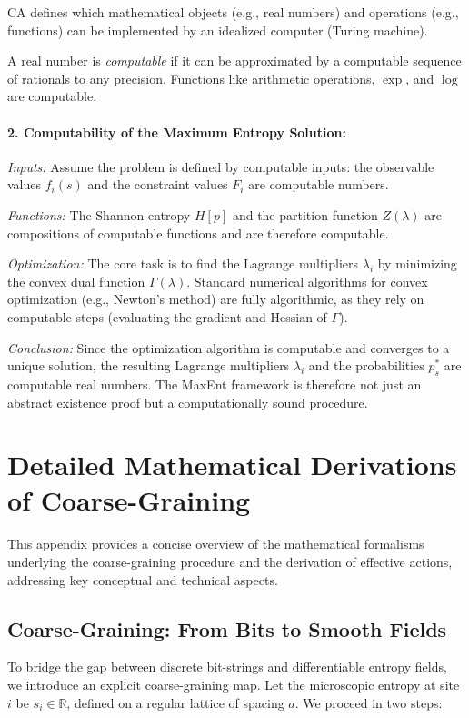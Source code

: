 \documentclass[12pt, a4paper]{article}
\begin{document}
CA defines which mathematical objects (e.g., real numbers) and operations (e.g., functions) can be implemented by an idealized computer (Turing machine).

A real number is \emph{computable} if it can be approximated by a computable sequence of rationals to any precision. Functions like arithmetic operations, \(\exp\), and \(\log\) are computable.

\paragraph{2. Computability of the Maximum Entropy Solution:}

\emph{Inputs:} Assume the problem is defined by computable inputs: the observable values \(f_i(s)\) and the constraint values \(F_i\) are computable numbers.

\emph{Functions:} The Shannon entropy \(H[p]\) and the partition function \(Z(\lambda)\) are compositions of computable functions and are therefore computable.

\emph{Optimization:} The core task is to find the Lagrange multipliers \(\lambda_i\) by minimizing the convex dual function \(\Gamma(\lambda)\). Standard numerical algorithms for convex optimization (e.g., Newton's method) are fully algorithmic, as they rely on computable steps (evaluating the gradient and Hessian of \(\Gamma\)).

\emph{Conclusion:} Since the optimization algorithm is computable and converges to a unique solution, the resulting Lagrange multipliers \(\lambda_i\) and the probabilities \(p_s^*\) are computable real numbers. The MaxEnt framework is therefore not just an abstract existence proof but a computationally sound procedure.

\section{Detailed Mathematical Derivations of Coarse-Graining}

This appendix provides a concise overview of the mathematical formalisms underlying the coarse-graining procedure and the derivation of effective actions, addressing key conceptual and technical aspects.
\subsection{Coarse-Graining: From Bits to Smooth Fields}

To bridge the gap between discrete bit-strings and differentiable entropy fields, we introduce an explicit coarse-graining map. Let the microscopic entropy at site $i$ be $s_i \in \mathbb{R}$, defined on a regular lattice of spacing $a$. We proceed in two steps:
\end{document}
